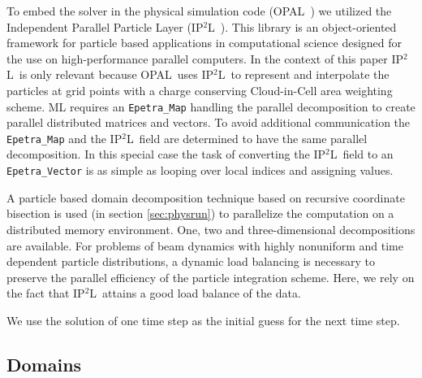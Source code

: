 \documentclass[a4paper,10pt,3p,preprint,pdftex]{elsarticle}
\newcommand{\opal}{\textsc{OPAL}}
\newcommand{\ippl}{\textsc{IP$^2$L}}
\begin{document}
To embed the solver in the physical simulation code (\opal~\cite{opal})
we utilized the Independent Parallel Particle Layer (\ippl~\cite{ippl}).
This library is an object-oriented framework for particle based
applications in computational science designed for the use on
high-performance parallel computers.  In the context of this paper
\ippl\ is only relevant because \opal\ uses \ippl\ to represent and
interpolate the particles at grid points with a charge conserving
Cloud-in-Cell area weighting scheme.  ML requires an
\texttt{Epetra\_Map} handling the parallel decomposition to create
parallel distributed matrices and vectors. To avoid additional
communication the \texttt{Epetra\_Map} and the \ippl\ field are determined
to have the same parallel decomposition. In this special case the task
of converting the \ippl\ field to an \texttt{Epetra\_Vector} is as
simple as looping over local indices and assigning values.  

A particle based domain decomposition technique based on recursive coordinate
bisection is used (in section \ref{sec:physrun}) to parallelize the computation
on a distributed memory environment.  One, two and three-dimensional
decompositions are available.  For problems of beam dynamics with highly
nonuniform and time dependent particle distributions, a dynamic load balancing
is necessary to preserve the parallel efficiency of the particle integration
scheme.  Here, we rely on the fact that \ippl\ attains a good load balance of
the data.



We use the solution of one time step as the initial guess for the next
time step.


\subsection{Domains}
\end{document}
